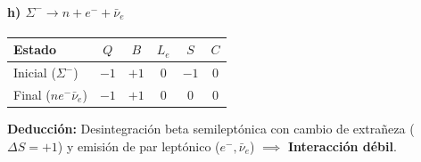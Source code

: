 \begin{problema}
\paragraph{h) $\Sigma^- \rightarrow n + e^- + \bar{\nu}_e$}
\begin{center}
\small
\begin{tabular}{lccccc}
\toprule
\textbf{Estado} & $Q$ & $B$ & $L_e$ & $S$ & $C$ \\
\midrule
Inicial ($\Sigma^-$) & $-1$ & $+1$ & $0$ & $-1$ & $0$ \\
Final ($n e^- \bar{\nu}_e$) & $-1$ & $+1$ & $0$ & $0$ & $0$ \\
\bottomrule
\end{tabular}
\end{center}
\textbf{Deducción:} Desintegración beta semileptónica con cambio de extrañeza ($\Delta S = +1$) y emisión de par leptónico ($e^-, \bar{\nu}_e$) $\implies$ \textbf{Interacción débil}.
\end{problema}
\newpage
